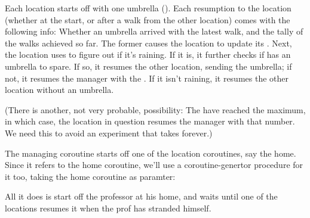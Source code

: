 
\n Each location starts off with one umbrella (). Each resumption to the location (whether at the start, or
after a walk from the other location) comes with the following
info: Whether an umbrella arrived with the latest walk, and the
tally of the walks achieved so far. The former causes the
location to update its . Next, the location uses
 to figure out if it’s raining. If it is, it further
checks if has an umbrella to spare. If so, it resumes the other
location, sending the umbrella; if not, it resumes the manager
with the . If it isn’t raining, it resumes the
other location without an umbrella.

(There is another, not very probable, possibility: The
 have reached the maximum, in which case, the
location in question resumes the manager with that number. We
need this to avoid an experiment that takes forever.)

The managing coroutine starts off one of the location coroutines,
say the home. Since it refers to the home coroutine, we’ll use a
coroutine-genertor procedure for it too, taking the home
coroutine as paramter:


\n All it does is start off the professor at his home, and waits
until one of the locations resumes it when the prof has stranded
himself.

